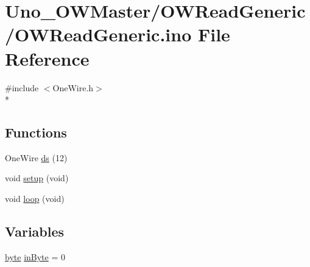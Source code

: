 \hypertarget{OWReadGeneric_8ino}{\section{Uno\-\_\-\-O\-W\-Master/\-O\-W\-Read\-Generic/\-O\-W\-Read\-Generic.ino File Reference}
\label{OWReadGeneric_8ino}
}
{\ttfamily \#include $<$One\-Wire.\-h$>$}\\*
\subsection*{Functions}
\begin{DoxyCompactItemize}
\item 
One\-Wire \hyperlink{OWReadGeneric_8ino_a964b61090de1a28914b540d275b3cda8}{ds} (12)
\item 
void \hyperlink{OWReadGeneric_8ino_a7dfd9b79bc5a37d7df40207afbc5431f}{setup} (void)
\item 
void \hyperlink{OWReadGeneric_8ino_a0b33edabd7f1c4e4a0bf32c67269be2f}{loop} (void)
\end{DoxyCompactItemize}
\subsection*{Variables}
\begin{DoxyCompactItemize}
\item 
\hyperlink{Arduino_8h_ab8ef12fab634c171394422d0ee8baf94}{byte} \hyperlink{OWReadGeneric_8ino_a62cd173143ff9c15a38fd17ab56970c9}{in\-Byte} = 0
\end{DoxyCompactItemize}


